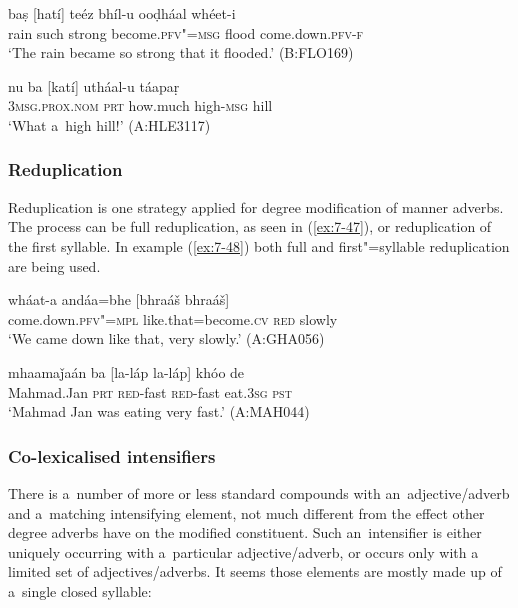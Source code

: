 \begin{exe}
\ex
\label{ex:7-45}
\gll baṣ [hatí] teéz bhíl-u ooḍháal whéet-i \\
rain such strong become.\textsc{pfv"=msg} flood come.down.\textsc{pfv-f} \\
\glt `The rain became so strong that it flooded.' (B:FLO169)
\end{exe}
\begin{exe}
\ex
\label{ex:7-46}
\gll nu ba [katí] utháal-u táapaṛ \\
\textsc{3msg.prox.nom} \textsc{prt} how.much high-\textsc{msg}  hill  \\
\glt `What a~high hill!' (A:HLE3117)
\end{exe}

\subsubsection*{Reduplication}

Reduplication is one strategy applied for degree modification of manner adverbs. The process can be
full reduplication, as seen in (\ref{ex:7-47}), or reduplication of the first syllable. In example
(\ref{ex:7-48}) both full and first"=syllable reduplication are being used.

\begin{exe}
\ex
\label{ex:7-47}
\gll wháat-a andáa=bhe [bhraáš bhraáš] \\
come.down.\textsc{pfv"=mpl} like.that=become.\textsc{cv} \textsc{red} slowly  \\
\glt `We came down like that, very slowly.' (A:GHA056)
\end{exe}
\begin{exe}
\ex
\label{ex:7-48}
\gll mhaamaǰaán ba [la-láp la-láp] khóo de \\
Mahmad.Jan \textsc{prt} \textsc{red}-fast \textsc{red}-fast eat.\textsc{3sg} \textsc{pst } \\
\glt `Mahmad Jan was eating very fast.' (A:MAH044)
\end{exe}

\subsubsection*{Co-lexicalised intensifiers}

There is a~number of more or less standard compounds with an~adjective/adverb and a~matching intensifying
element, not much different from the effect
other degree adverbs have on the modified constituent. Such an~intensifier is either uniquely occurring with a~particular adjective/adverb, or occurs only with a limited set of adjectives/adverbs. It seems those elements are mostly made up of a~single closed syllable:


